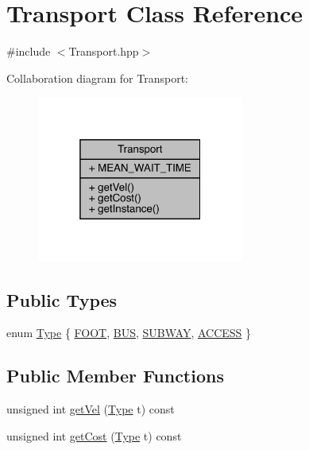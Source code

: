 \hypertarget{class_transport}{}\section{Transport Class Reference}
\label{class_transport}


{\ttfamily \#include $<$Transport.\+hpp$>$}



Collaboration diagram for Transport\+:
\nopagebreak
\begin{figure}[H]
\begin{center}
\leavevmode
\includegraphics[width=193pt]{class_transport__coll__graph}
\end{center}
\end{figure}
\subsection*{Public Types}
\begin{DoxyCompactItemize}
\item 
enum \hyperlink{class_transport_a1879cecfed0d4238e5a7af6d085db317}{Type} \{ \hyperlink{class_transport_a1879cecfed0d4238e5a7af6d085db317a9eb45a1db8620c55d48eeee34f09980c}{F\+O\+OT}, 
\hyperlink{class_transport_a1879cecfed0d4238e5a7af6d085db317a03910f9910b1cda89566027b1c4f2740}{B\+US}, 
\hyperlink{class_transport_a1879cecfed0d4238e5a7af6d085db317a1e7a9bb5192d54bdccb9bc99bd35849b}{S\+U\+B\+W\+AY}, 
\hyperlink{class_transport_a1879cecfed0d4238e5a7af6d085db317ae0cc8f327733360f7ccf5abf2b5e7454}{A\+C\+C\+E\+SS}
 \}
\end{DoxyCompactItemize}
\subsection*{Public Member Functions}
\begin{DoxyCompactItemize}
\item 
unsigned int \hyperlink{class_transport_ae9b8f3d27331e429160827194e32bde1}{get\+Vel} (\hyperlink{class_transport_a1879cecfed0d4238e5a7af6d085db317}{Type} t) const
\item 
unsigned int \hyperlink{class_transport_a943eecabe9f2435fcbf2bd3a41a4ea3a}{get\+Cost} (\hyperlink{class_transport_a1879cecfed0d4238e5a7af6d085db317}{Type} t) const
\end{DoxyCompactItemize}

